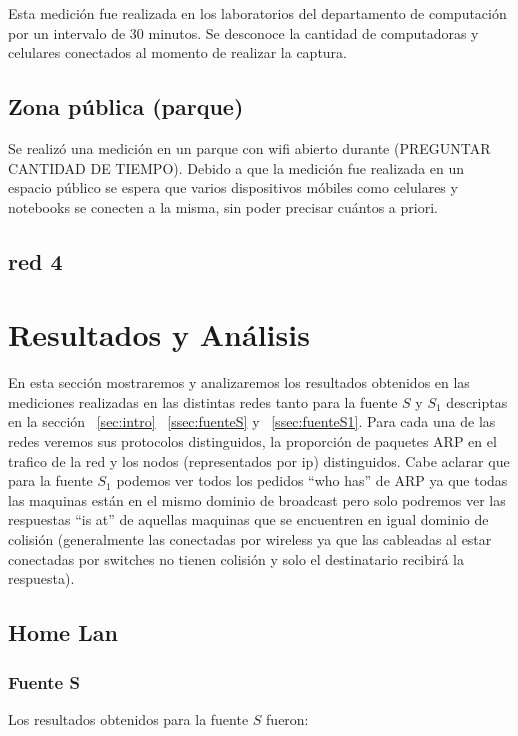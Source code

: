 \documentclass[final,inline,narroweqnarray,a4paper]{ieee}
\begin{document}
Esta medición fue realizada en los laboratorios del departamento de computación por un intervalo de 30 minutos. Se desconoce la cantidad de computadoras y celulares conectados al momento de realizar la captura.

\subsection{Zona pública (parque)}
Se realizó una medición en un parque con wifi abierto durante (PREGUNTAR CANTIDAD DE TIEMPO). Debido a que la medición fue realizada en un espacio público se espera que varios dispositivos móbiles como celulares y notebooks se conecten a la misma, sin poder precisar cuántos a priori.


\subsection{red 4}

\section{Resultados y Análisis}
En esta sección mostraremos y analizaremos los resultados obtenidos en las mediciones realizadas en las distintas redes tanto para la fuente $S$ y $S_1$ descriptas en la sección ~\ref{sec:intro} ~\ref{ssec:fuenteS} y ~\ref{ssec:fuenteS1}. Para cada una de las redes veremos sus protocolos distinguidos, la proporción de paquetes ARP en el trafico de la red y los nodos (representados por ip) distinguidos. Cabe aclarar que para la fuente $S_1$ podemos ver todos los pedidos ``who has'' de ARP ya que todas las maquinas están en el mismo dominio de broadcast pero solo podremos ver las respuestas ``is at'' de aquellas maquinas que se encuentren en igual dominio de colisión (generalmente las conectadas por wireless ya que las cableadas al estar conectadas por switches no tienen colisión y solo el destinatario recibirá la respuesta). 


\subsection{Home Lan}
\subsubsection{Fuente S}

Los resultados obtenidos para la fuente $S$ fueron:
\end{document}
